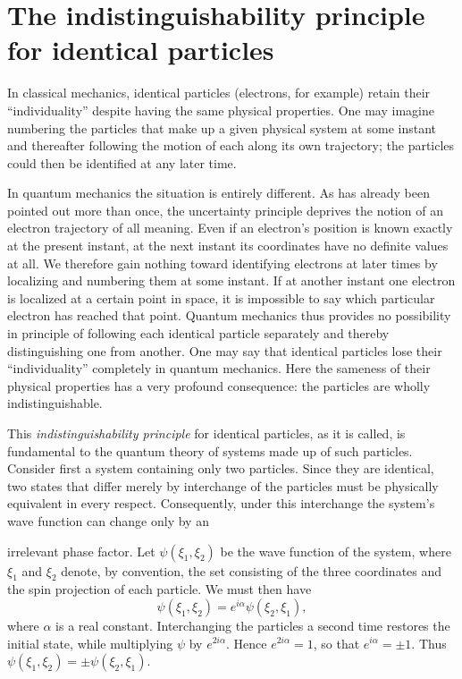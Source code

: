 \section{The indistinguishability principle for identical particles}

In classical mechanics, identical particles (electrons, for example) retain their ``individuality'' despite having the same physical properties. One may imagine numbering the particles that make up a given physical system at some instant and thereafter following the motion of each along its own trajectory; the particles could then be identified at any later time.

In quantum mechanics the situation is entirely different. As has already been pointed out more than once, the uncertainty principle deprives the notion of an electron trajectory of all meaning. Even if an electron's position is known exactly at the present instant, at the next instant its coordinates have no definite values at all. We therefore gain nothing toward identifying electrons at later times by localizing and numbering them at some instant. If at another instant one electron is localized at a certain point in space, it is impossible to say which particular electron has reached that point. Quantum mechanics thus provides no possibility in principle of following each identical particle separately and thereby distinguishing one from another. One may say that identical particles lose their ``individuality'' completely in quantum mechanics. Here the sameness of their physical properties has a very profound consequence: the particles are wholly indistinguishable.

This \emph{indistinguishability principle} for identical particles, as it is called, is fundamental to the quantum theory of systems made up of such particles. Consider first a system containing only two particles. Since they are identical, two states that differ merely by interchange of the particles must be physically equivalent in every respect. Consequently, under this interchange the system's wave function can change only by an

irrelevant phase factor. Let $\psi(\xi_1,\xi_2)$ be the wave function of the system, where $\xi_1$ and $\xi_2$ denote, by convention, the set consisting of the three coordinates and the spin projection of each particle. We must then have
\[
  \psi(\xi_1,\xi_2)=e^{i\alpha}\psi(\xi_2,\xi_1),
\]
where $\alpha$ is a real constant. Interchanging the particles a second time restores the initial state, while multiplying $\psi$ by $e^{2i\alpha}$. Hence $e^{2i\alpha}=1$, so that $e^{i\alpha}=\pm1$. Thus $\psi(\xi_1,\xi_2)=\pm\psi(\xi_2,\xi_1)$.

